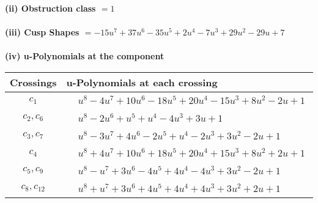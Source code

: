 \documentclass[1p]{elsarticle_modified}
\theoremstyle{definition}
\begin{document}
\flushleft \textbf{(ii) Obstruction class $= 1$}\\~\\
\flushleft \textbf{(iii) Cusp Shapes $= -15 u^7+37 u^6-35 u^5+2 u^4-7 u^3+29 u^2-29 u+7$}\\~\\
\newpage\renewcommand{\arraystretch}{1}
\flushleft \textbf{(iv) u-Polynomials at the component}\newline \\
\begin{tabular}{m{50pt}|m{274pt}}
Crossings & \hspace{64pt}u-Polynomials at each crossing \\
\hline $$\begin{aligned}c_{1}\end{aligned}$$&$\begin{aligned}
&u^8-4 u^7+10 u^6-18 u^5+20 u^4-15 u^3+8 u^2-2 u+1
\end{aligned}$\\
\hline $$\begin{aligned}c_{2},c_{6}\end{aligned}$$&$\begin{aligned}
&u^8-2 u^6+u^5+u^4-4 u^3+3 u+1
\end{aligned}$\\
\hline $$\begin{aligned}c_{3},c_{7}\end{aligned}$$&$\begin{aligned}
&u^8-3 u^7+4 u^6-2 u^5+u^4-2 u^3+3 u^2-2 u+1
\end{aligned}$\\
\hline $$\begin{aligned}c_{4}\end{aligned}$$&$\begin{aligned}
&u^8+4 u^7+10 u^6+18 u^5+20 u^4+15 u^3+8 u^2+2 u+1
\end{aligned}$\\
\hline $$\begin{aligned}c_{5},c_{9}\end{aligned}$$&$\begin{aligned}
&u^8- u^7+3 u^6-4 u^5+4 u^4-4 u^3+3 u^2-2 u+1
\end{aligned}$\\
\hline $$\begin{aligned}c_{8},c_{12}\end{aligned}$$&$\begin{aligned}
&u^8+u^7+3 u^6+4 u^5+4 u^4+4 u^3+3 u^2+2 u+1
\end{aligned}$\\

\end{tabular}
\end{document}
